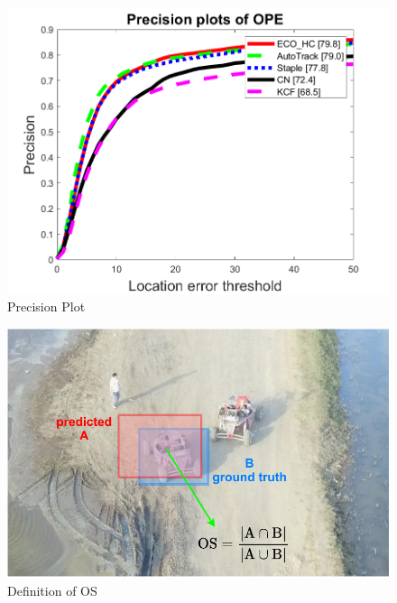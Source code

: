 \documentclass{beamer}
\begin{document}
\begin{frame}
    \begin{figure}[htpb]
        \begin{center}
            \includegraphics[width=0.8\linewidth]{fig/pre.png}
            \caption{Precision Plot}
        \end{center}
    \end{figure}
\end{frame}

\begin{frame}
    \begin{figure}[htpb]
        \begin{center}
            \includegraphics[width=0.8\linewidth]{fig/OS.pdf}
            \caption{Definition of OS}
        \end{center}
    \end{figure}
\end{frame}
\end{document}

